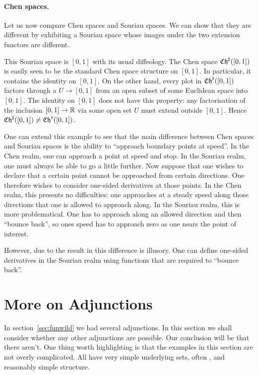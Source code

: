 \documentclass[%
12pt,%
arxiv,%
defaults
]{myclass}
\begin{document}
\paragraph{Chen spaces.}
Let us now compare Chen spaces and Souriau spaces.
We can show that they are different by exhibiting a Souriau space whose images under the two extension functors are different.

This Souriau space is \([0,1]\) with its usual diffeology.
The Chen space \(\SoCht([0,1])\) is easily seen to be the standard Chen space structure on \([0,1]\).
In particular, it contains the identity on \([0,1]\).
On the other hand, every plot in \(\SoChb([0,1])\) factors through a \cimap \(U \to [0,1]\) from an open subset of some Euclidean space into \([0,1]\).
The identity on \([0,1]\) does not have this property: any factorisation of the inclusion \([0,1] \to \mathbb{R}\) via some open set \(U\) must extend outside \([0,1]\).
Hence \(\SoCht([0,1]) \ne \SoChb([0,1])\).

One can extend this example to see that the main difference between Chen spaces and Souriau spaces is the ability to ``approach boundary points at speed''.
In the Chen realm, one can approach a point at speed and stop.
In the Souriau realm, one must always be able to go a little further.
Now suppose that one wishes to declare that a certain point cannot be approached from certain directions.
One therefore wishes to consider one\hyp{}sided derivatives at those points.
In the Chen realm, this presents no difficulties: one approaches at a steady speed along those directions that one is allowed to approach along.
In the Souriau realm, this is more problematical.
One has to approach along an allowed direction and then ``bounce back'', so ones speed has to approach zero as one nears the point of interest.

However, due to the result in \cite[24.5]{akpm} this difference is illusory.
One can define one\hyp{}sided derivatives in the Souriau realm using functions that are required to ``bounce back''.


\section{More on Adjunctions}
\label{sec:adjoint}

In section~\ref{sec:funwild} we had several adjunctions.
In this section we shall consider whether any other adjunctions are possible.
Our conclusion will be that there aren't.
One thing worth highlighting is that the examples in this section are not overly complicated.
All have very simple underlying sets, often \R, and reasonably simple structure.
\end{document}
